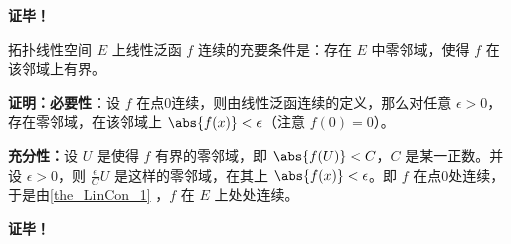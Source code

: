 \textbf{证毕！}

\begin{theorem}{}
 拓扑线性空间 $E$ 上线性泛函 $f$ 连续的充要条件是：存在 $E$ 中零邻域，使得 $f$ 在该邻域上有界。
\end{theorem}

\textbf{证明：}\textbf{必要性}：设 $f$ 在点0连续，则由线性泛函连续的定义，那么对任意 $\epsilon>0$，存在零邻域，在该邻域上 $\abs{f(x)}<\epsilon$（注意 $f(0)=0$）。

\textbf{充分性：}设 $U$ 是使得 $f$ 有界的零邻域，即 $\abs{f(U)}<C$，$C$ 是某一正数。并设 $\epsilon>0$，则 $\frac{\epsilon}{C}U$ 是这样的零邻域，在其上 $\abs{f(x)}<\epsilon$。即 $f$ 在点0处连续，于是由\autoref{the_LinCon_1} ，$f$ 在 $E$ 上处处连续。



\textbf{证毕！}




